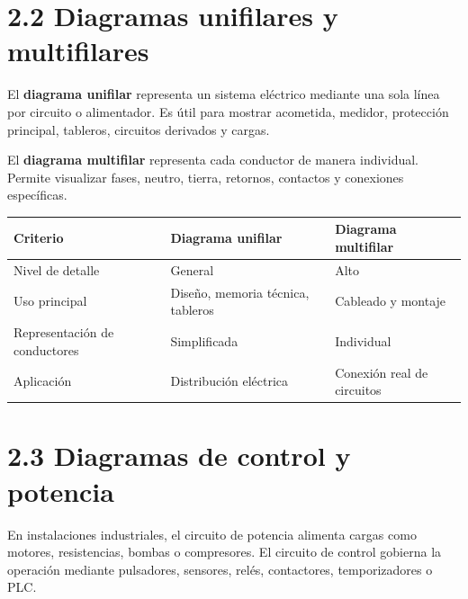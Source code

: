\documentclass[
  spanish,
  letterpaper,
  DIV=11,
  numbers=noendperiod]{scrreprt}
\newcounter{none} %
\begin{document}
\section{2.2 Diagramas unifilares y
multifilares}\label{diagramas-unifilares-y-multifilares}

El \textbf{diagrama unifilar} representa un sistema eléctrico mediante
una sola línea por circuito o alimentador. Es útil para mostrar
acometida, medidor, protección principal, tableros, circuitos derivados
y cargas.

El \textbf{diagrama multifilar} representa cada conductor de manera
individual. Permite visualizar fases, neutro, tierra, retornos,
contactos y conexiones específicas.

{\def\LTcaptype{none} %
\begin{longtable}[]{@{}
  >{\raggedright\arraybackslash}p{}
  >{\raggedright\arraybackslash}p{}
  >{\raggedright\arraybackslash}p{}@{}}
\toprule\noalign{}
\begin{minipage}[b]{\linewidth}\raggedright
Criterio
\end{minipage} & \begin{minipage}[b]{\linewidth}\raggedright
Diagrama unifilar
\end{minipage} & \begin{minipage}[b]{\linewidth}\raggedright
Diagrama multifilar
\end{minipage} \\
\midrule\noalign{}
\endhead
\bottomrule\noalign{}
\endlastfoot
Nivel de detalle & General & Alto \\
Uso principal & Diseño, memoria técnica, tableros & Cableado y
montaje \\
Representación de conductores & Simplificada & Individual \\
Aplicación & Distribución eléctrica & Conexión real de circuitos \\
\end{longtable}
}

\section{2.3 Diagramas de control y
potencia}\label{diagramas-de-control-y-potencia}

En instalaciones industriales, el circuito de potencia alimenta cargas
como motores, resistencias, bombas o compresores. El circuito de control
gobierna la operación mediante pulsadores, sensores, relés, contactores,
temporizadores o PLC.
\end{document}
